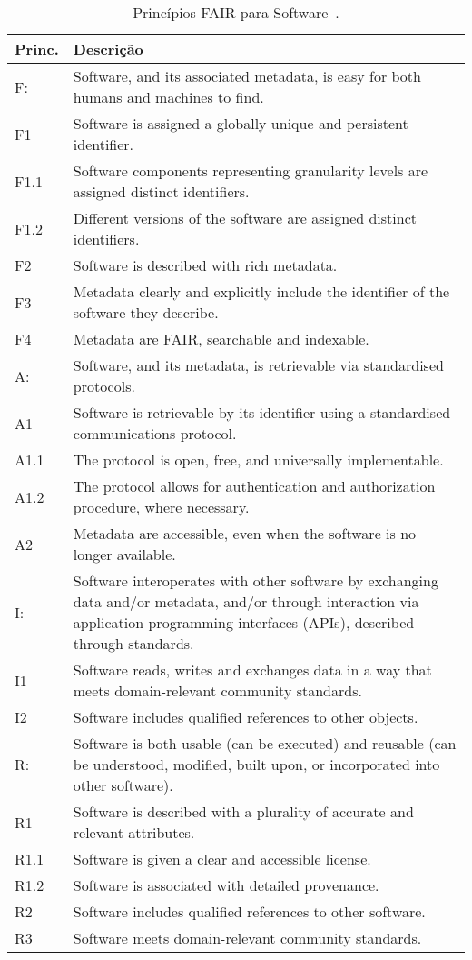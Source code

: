 \begin{table}[htbp]
    \caption{Princípios FAIR para Software~\cite{barker:2022}.}
    \centering
    \small
    \begin{tabular}{p{1.1cm}|p{13cm}}
    \hline
    \textbf{Princ.} & \textbf{Descrição} \\ \hline
    F: & Software, and its associated metadata, is easy for both humans and machines to find.\\
    F1 & Software is assigned a globally unique and persistent identifier.\\
    F1.1 & Software components representing granularity levels are assigned distinct identifiers.\\
    F1.2 & Different versions of the software are assigned distinct identifiers.\\
    F2 & Software is described with rich metadata. \\
    F3 & Metadata clearly and explicitly include the identifier of the software they describe.\\
    F4 & Metadata are FAIR, searchable and indexable.\\ \hline
    A: & Software, and its metadata, is retrievable via standardised protocols.\\
    A1 & Software is retrievable by its identifier using a standardised communications protocol. \\
    A1.1 & The protocol is open, free, and universally implementable.\\
    A1.2 & The protocol allows for authentication and authorization procedure, where necessary. \\
    A2 & Metadata are accessible, even when the software is no longer available.\\ \hline
    I: & Software interoperates with other software by exchanging data and/or metadata, and/or through interaction via application programming interfaces (APIs), described through standards.\\
    I1 &  Software reads, writes and exchanges data in a way that meets domain-relevant community standards.\\
    I2 & Software includes qualified references to other objects.\\
      \hline
    R: & Software is both usable (can be executed) and reusable (can be understood, modified, built upon, or incorporated into other software).\\
    R1 & Software is described with a plurality of accurate and relevant attributes.\\
    R1.1 & Software is given a clear and accessible license. \\ 
    R1.2 & Software is associated with detailed provenance.\\
    R2 & Software includes qualified references to other software.\\
    R3 & Software meets domain-relevant community standards. \\
      \hline
    \end{tabular} \label{tab:fairness:4:rs:r}
\end{table}